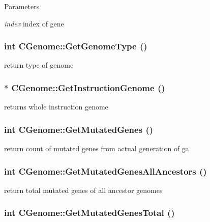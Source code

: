 \begin{DoxyParams}{Parameters}
\item[{\em index}]index of gene \end{DoxyParams}
\hypertarget{classCGenome_a47f359ecc2d00012b13042ae19a6e078}{
\subsubsection[{GetGenomeType}]{\setlength{\rightskip}{0pt plus 5cm}int CGenome::GetGenomeType ()}}
\label{classCGenome_a47f359ecc2d00012b13042ae19a6e078}
return type of genome \hypertarget{classCGenome_aa39c3fd7b912f6d3c9a6ea6b21f53e93}{
\subsubsection[{GetInstructionGenome}]{ $\ast$ CGenome::GetInstructionGenome ()}}
\label{classCGenome_aa39c3fd7b912f6d3c9a6ea6b21f53e93}
returns whole instruction genome \hypertarget{classCGenome_a5032f14a89999743b28c9b758efbcd63}{
\subsubsection[{GetMutatedGenes}]{\setlength{\rightskip}{0pt plus 5cm}int CGenome::GetMutatedGenes ()}}
\label{classCGenome_a5032f14a89999743b28c9b758efbcd63}
return count of mutated genes from actual generation of ga \hypertarget{classCGenome_a38b0bff8dfc37da6ad24e546bcd09d21}{
\subsubsection[{GetMutatedGenesAllAncestors}]{\setlength{\rightskip}{0pt plus 5cm}int CGenome::GetMutatedGenesAllAncestors ()}}
\label{classCGenome_a38b0bff8dfc37da6ad24e546bcd09d21}
return total mutated genes of all ancestor genomes \hypertarget{classCGenome_a06e87239b9570b6ece30d735218ad62e}{
\subsubsection[{GetMutatedGenesTotal}]{\setlength{\rightskip}{0pt plus 5cm}int CGenome::GetMutatedGenesTotal ()}}

